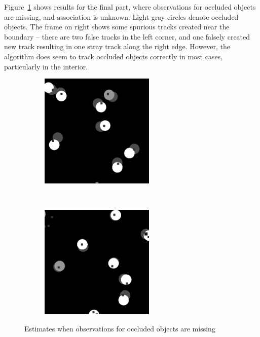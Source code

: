 \documentclass[a4paper]{article}
\begin{document}
Figure~\ref{fig:occluded_ml} shows results for the final part, where
observations for occluded objects are missing, and association is unknown.
Light gray circles denote occluded objects.
The frame on right shows some spurious tracks created near the boundary --
there are two false tracks in the left corner, and one falsely created new
track resulting in one stray track along the right edge.
However, the algorithm does seem to track occluded objects correctly in 
most cases, particularly in the interior.
\begin{figure}[h]
  \centering
  \begin{subfigure}{0.48\textwidth}
  \centering
  \includegraphics[width=0.6\textwidth]{images/occluded_ml_1.png}
  \end{subfigure}~
  \begin{subfigure}{0.48\textwidth}
  \centering
  \includegraphics[width=0.6\textwidth]{images/occluded_ml_2.png}
  \end{subfigure}
  \caption{Estimates when observations for occluded objects are missing}
  \label{fig:occluded_ml}
  \vspace{-2pt}
\end{figure}
\end{document}
